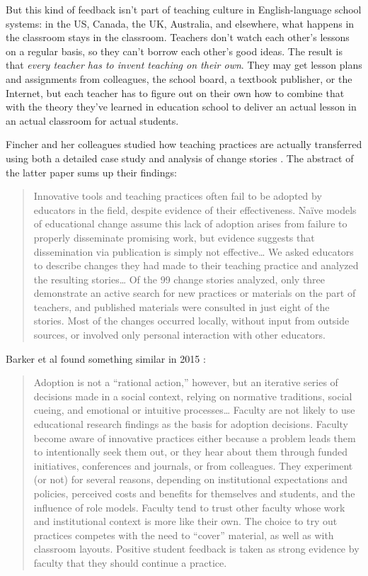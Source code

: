 But this kind of feedback isn't part of teaching culture in
English-language school systems: in the US, Canada, the UK, Australia,
and elsewhere, what happens in the classroom stays in the classroom.
Teachers don't watch each other's lessons on a regular basis, so they
can't borrow each other's good ideas. The result is that \emph{every
teacher has to invent teaching on their own}. They may get lesson plans
and assignments from colleagues, the school board, a textbook publisher,
or the Internet, but each teacher has to figure out on their own how to
combine that with the theory they've learned in education school to
deliver an actual lesson in an actual classroom for actual students.

Fincher and her colleagues studied how teaching practices are actually
transferred using both a detailed case study \cite{bib:fincher-warrens-questions}
and analysis of change stories \cite{bib:fincher-stories-change}.
The abstract of the latter paper sums up their findings:

\begin{quote}
Innovative tools and teaching practices often fail to be adopted by
educators in the field, despite evidence of their effectiveness. Naïve
models of educational change assume this lack of adoption arises from
failure to properly disseminate promising work, but evidence suggests
that dissemination via publication is simply not effective\ldots{} We
asked educators to describe changes they had made to their teaching
practice and analyzed the resulting stories\ldots{} Of the 99 change
stories analyzed, only three demonstrate an active search for new
practices or materials on the part of teachers, and published materials
were consulted in just eight of the stories. Most of the changes
occurred locally, without input from outside sources, or involved only
personal interaction with other educators.
\end{quote}

Barker et al found something similar in 2015 \cite{bib:barker-practice-adoption}:

\begin{quote}
Adoption is not a ``rational action,'' however, but an iterative series
of decisions made in a social context, relying on normative traditions,
social cueing, and emotional or intuitive processes\ldots{}
Faculty are not likely to use educational research findings as the
basis for adoption decisions. Faculty become aware of innovative
practices either because a problem leads them to intentionally seek them
out, or they hear about them through funded initiatives, conferences and
journals, or from colleagues. They experiment (or not) for several
reasons, depending on institutional expectations and policies, perceived
costs and benefits for themselves and students, and the influence of
role models. Faculty tend to trust other faculty whose work and
institutional context is more like their own. The choice to try out
practices competes with the need to ``cover'' material, as well as with
classroom layouts. Positive student feedback is taken as strong evidence
by faculty that they should continue a practice.
\end{quote}

